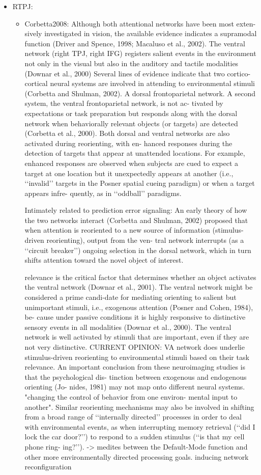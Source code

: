 \documentclass{article} %
\begin{document}
\begin{itemize}
  \item
    RTPJ:
    \begin{itemize}
\item
Corbetta2008:
Although both attentional networks have been most exten- sively investigated in vision, the available evidence indicates a supramodal function (Driver and Spence, 1998; Macaluso et al., 2002). The ventral network (right TPJ, right IFG) registers salient events in the environment not only in the visual but also in the auditory and tactile modalities (Downar et al., 2000)
Several lines of evidence indicate that two cortico-cortical neural systems are involved in attending to environmental stimuli (Corbetta and Shulman, 2002). A dorsal frontoparietal network. A second system, the ventral frontoparietal network, is not ac- tivated by expectations or task preparation but responds along with the dorsal network when behaviorally relevant objects (or targets) are detected (Corbetta et al., 2000). Both dorsal and ventral networks are also activated during reorienting, with en- hanced responses during the detection of targets that appear at unattended locations. For example, enhanced responses are observed when subjects are cued to expect a target at one location but it unexpectedly appears at another (i.e., ‘‘invalid’’ targets in the Posner spatial cueing paradigm)
or when a target appears infre- quently, as in ‘‘oddball’’ paradigms.

Intimately related to prediction error signaling:
An early theory of how the two networks interact (Corbetta and Shulman, 2002) proposed that when attention is reoriented to a new source 
of information (stimulus-driven reorienting), output from the ven- tral network interrupts (as a ‘‘circuit breaker’’) ongoing selection in the dorsal network, which in turn shifts attention toward the novel object of interest.

relevance is the critical factor that determines whether an object activates the ventral network (Downar et al., 2001). The ventral network might be considered a prime candi-date for mediating orienting to salient but unimportant stimuli, i.e., exogenous attention (Posner and Cohen, 1984), be- cause under passive conditions it is highly responsive to distinctive sensory
events in all modalities (Downar et al., 2000). The ventral network is well activated by stimuli that are important, even if they are not very distinctive. 
CURRENT OPINION: VA network does underlie  stimulus-driven reorienting to environmental stimuli based on their task relevance. An important conclusion from these neuroimaging studies is that the psychological dis- tinction between exogenous and endogenous orienting (Jo- nides, 1981) may not map onto different neural systems. "changing the control of behavior from one environ- mental input to another". Similar reorienting mechanisms may also be involved in shifting from a broad range of ‘‘internally directed’’ processes in order to deal with environmental events, as when interrupting memory retrieval (‘‘did I lock the car door?’’) to respond to a sudden stimulus (‘‘is that my cell phone ring- ing?’’). -> medites between the Default-Mode function and other more environmentally directed processing goals.
inducing network reconfiguration


\end{itemize}
\end{itemize}
\end{document}
